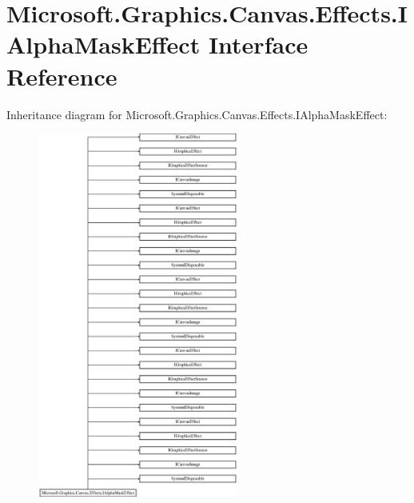 \hypertarget{interface_microsoft_1_1_graphics_1_1_canvas_1_1_effects_1_1_i_alpha_mask_effect}{}\section{Microsoft.\+Graphics.\+Canvas.\+Effects.\+I\+Alpha\+Mask\+Effect Interface Reference}
\label{interface_microsoft_1_1_graphics_1_1_canvas_1_1_effects_1_1_i_alpha_mask_effect}
Inheritance diagram for Microsoft.\+Graphics.\+Canvas.\+Effects.\+I\+Alpha\+Mask\+Effect\+:\begin{figure}[H]
\begin{center}
\leavevmode
\includegraphics[height=12.000000cm]{interface_microsoft_1_1_graphics_1_1_canvas_1_1_effects_1_1_i_alpha_mask_effect}
\end{center}
\end{figure}
